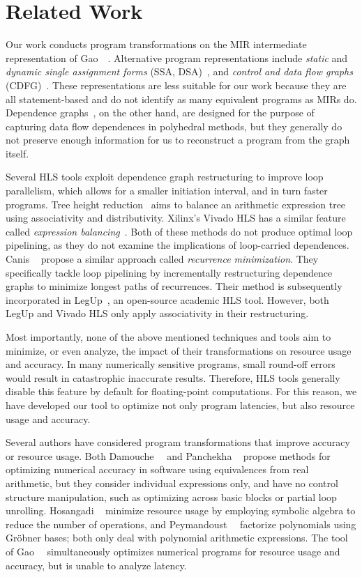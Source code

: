 \section{Related Work}
\label{sec:related_work}

Our work conducts program transformations on the MIR intermediate
representation of Gao~\etal~\cite{soap2}. Alternative program representations
include \emph{static} and \emph{dynamic single assignment forms} (SSA,
DSA)~\cite{rau92, cytron91}, and \emph{control and data flow graphs}
(CDFG)~\cite{gajski94}. These representations are less suitable for our work
because they are all statement-based and do not identify as many equivalent
programs as MIRs do. Dependence graphs~\cite{rau94}, on the other hand, are
designed for the purpose of capturing data flow dependences in polyhedral
methods, but they generally do not preserve enough information for us to
reconstruct a program from the graph itself.

Several HLS tools exploit dependence graph restructuring to improve loop
parallelism, which allows for a smaller initiation interval, and in turn faster
programs.  Tree height reduction~\cite{nicolau91} aims to balance an arithmetic
expression tree using associativity and distributivity. Xilinx's Vivado HLS has
a similar feature called \emph{expression balancing}~\cite{vivado_hls}.  Both
of these methods do not produce optimal loop pipelining, as they do not examine
the implications of loop-carried dependences.  Canis \etal~\cite{canis14}
propose a similar approach called \emph{recurrence minimization}. They
specifically tackle loop pipelining by incrementally restructuring dependence
graphs to minimize longest paths of recurrences. Their method is subsequently
incorporated in LegUp~\cite{legup}, an open-source academic HLS tool.  However,
both LegUp and Vivado HLS only apply associativity in their restructuring.

Most importantly, none of the above mentioned techniques and tools aim to
minimize, or even analyze, the impact of their transformations on resource
usage and accuracy. In many numerically sensitive programs, small round-off
errors would result in catastrophic inaccurate results. Therefore, HLS tools
generally disable this feature by default for floating-point computations. For
this reason, we have developed our tool to optimize not only program latencies,
but also resource usage and accuracy.

Several authors have considered program transformations that improve
accuracy or resource usage. Both Damouche~\etal~\cite{damouche15} and
Panchekha \etal~\cite{panchekha15} propose methods for optimizing numerical
accuracy in software using equivalences from real arithmetic, but they
consider individual expressions only, and have no control structure
manipulation, such as optimizing across basic blocks or partial loop
unrolling.  Hosangadi \etal~\cite{hosangadi} minimize resource usage
by employing symbolic algebra to reduce the number of operations, and
Peymandoust~\etal~\cite{peymandoust} factorize polynomials using Gr{\"o}bner
bases; both only deal with polynomial arithmetic expressions. The \SOAP{} tool
of Gao~\etal~\cite{soap2} simultaneously optimizes numerical programs for
resource usage and accuracy, but is unable to analyze latency.

